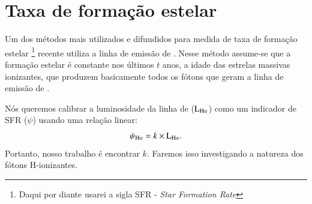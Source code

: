 \section{Taxa de formação estelar}
\label{sec:emlines:SFR}

Um dos métodos mais utilizados e difundidos para medida de taxa de formação estelar \footnote{Daqui
por diante usarei a sigla SFR - {\em Star Formation Rate}} recente utiliza a linha de emissão de
\Halpha. Nesse método assume-se que a formação estelar é constante nos últimos $t$ anos, a idade das
estrelas massivas ionizantes, que produzem basicamente todos os fótons que geram a linha de emissão
de \Halpha.

Nós queremos calibrar a luminosidade da linha de \Halpha ($\LHalpha$) como um indicador
de SFR ($\psi$) usando uma relação linear:
\begin{equation}
	\psi_{\Halpha} = k \times \LHalpha.
	\label{eq:SFRHa}
\end{equation}
\noindent Portanto, nosso trabalho é encontrar $k$. Faremos isso investigando a natureza dos 
fótons H-ionizantes.

